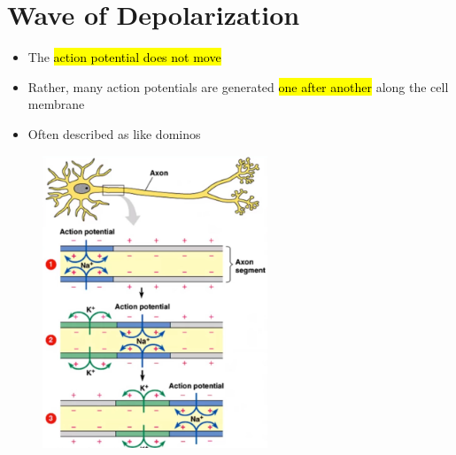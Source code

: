 \documentclass[a4paper,12pt]{article}
\begin{document}
\section{Wave of Depolarization}
\begin{itemize}
    \item{The \hl{action potential does not move}}
    \item{Rather, many action potentials are generated \hl{one after another} along the cell membrane}
    \item{Often described as like dominos}
\end{itemize}
\begin{figure}[H]
    \centering
    \includegraphics[width=0.60\textwidth]{wave}
\end{figure}
\end{document}
